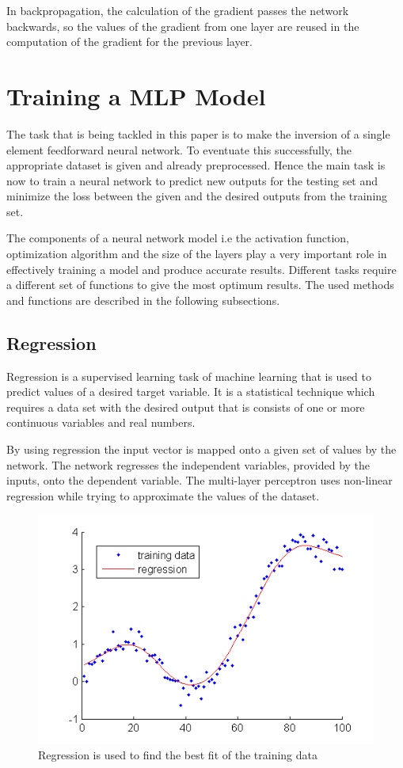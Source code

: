 In backpropagation, the calculation of the gradient passes the network backwards, so the values of the gradient from one layer are reused in the computation of the gradient for the previous layer. 



\section{Training a MLP Model}

The task that is being tackled in this paper is to make the inversion of a single element feedforward neural network. To eventuate this successfully, the appropriate dataset is given and already preprocessed. Hence the main task is now to train a neural network to predict new outputs for the testing set and minimize the loss between the given and the desired outputs from the training set. \medskip

The components of a neural network model i.e the activation function, optimization algorithm and the size of the layers play a very important role in effectively training a model and produce accurate results. Different tasks require a different set of functions to give the most optimum results. The used methods and functions are described in the following subsections.


\subsection{Regression}

Regression \cite{allen2007understanding} is a supervised learning task of machine learning that is used to predict values of a desired target variable. It is a statistical technique which requires a data set with the desired output that is consists of one or more continuous variables and real numbers.\smallskip

By using regression the input vector is mapped onto a given set of values by the network. The network regresses the independent variables, provided by the inputs, onto the dependent variable. The multi-layer perceptron uses non-linear regression while trying to approximate the values of the dataset.

\begin{figure}[h]
	\centering
	\includegraphics[height=0.4\linewidth]{./figures/regression}
	\caption{Regression is used to find the best fit of the training
		data}
	\label{fig:regression}
\end{figure}


